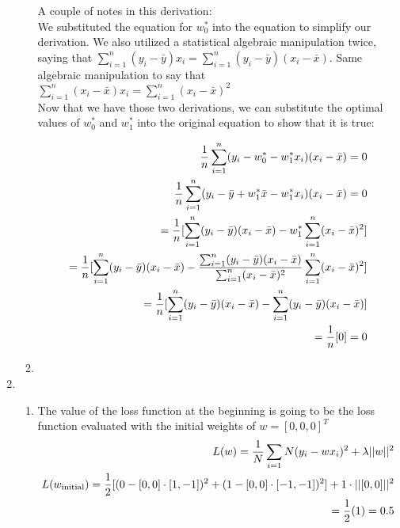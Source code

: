 \documentclass[12pt]{article}
\begin{document}
\begin{enumerate}
\begin{enumerate}
 A couple of notes in this derivation: \\ 

 We substituted the equation for $w_0^*$ into the equation to simplify our derivation. We also utilized a statistical algebraic manipulation twice, 
 saying that $\sum_{i=1}^{n} (y_i - \bar{y})x_i = \sum_{i=1}^{n} (y_i - \bar{y})(x_i - \bar{x})$. Same algebraic manipulation to say that 
 $\sum_{i=1}^{n} (x_i - \bar{x})x_i = \sum_{i=1}^{n} (x_i - \bar{x})^2$\\ 

 Now that we have those two derivations, we can substitute the optimal values of $w_0^*$ and $w_1^*$ into the original equation to show that it is true:

 \begin{align}
  \frac{1}{n} \sum_{i=1}^{n} (y_i - w^*_0 - w_{1}^{*}x_i)(x_i-\bar{x}) = 0 \notag \\ 
  \frac{1}{n} \sum_{i=1}^{n} (y_i - \bar{y} + w_1^* \bar{x} - w_1^*x_i) (x_i - \bar{x}) = 0 \notag \\ 
  = \frac{1}{n} [\sum_{i=1}^{n}(y_i-\bar{y})(x_i-\bar{x}) - w_1^* \sum_{i=1}^{n}(x_i-\bar{x})^2] \notag \\ 
  = \frac{1}{n}[\sum_{i=1}^{n}(y_i-\bar{y})(x_i-\bar{x}) - \frac{\sum_{i=1}^{n} (y_i - \bar{y})(x_i - \bar{x})}{\sum_{i=1}^{n} (x_i-\bar{x})^2} \sum_{i=1}^{n}(x_i-\bar{x})^2] \notag \\ 
  = \frac{1}{n}[\sum_{i=1}^{n}(y_i-\bar{y})(x_i-\bar{x}) - \sum_{i=1}^{n} (y_i - \bar{y})(x_i - \bar{x})] \notag \\  
  = \frac{1}{n} [0] = 0 \notag
 \end{align}
 \item 
  \end{enumerate}

\item
  \begin{enumerate}
  \item The value of the loss function at the beginning is going to be the loss function evaluated with the initial weights of $w = [0,0,0]^T$ \\ 
  \begin{align}
    L(w) = \frac{1}{N} \sum_{i = 1}{N} (y_i - wx_i)^2 + \lambda ||w||^2 \notag \\
    L(w_{\text{initial}}) = \frac{1}{2} [ (0 - [0,0] \cdot [1,-1])^2 + (1 - [0,0] \cdot [-1,-1])^2] + 1 \cdot ||[0,0]||^2 \notag \\ 
    = \frac{1}{2} (1) = 0.5 \notag
  \end{align}
  

\end{enumerate}
\end{enumerate}
\end{document}
